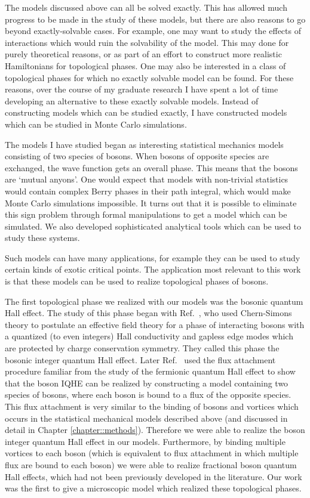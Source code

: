 The models discussed above can all be solved exactly. This has allowed much progress to be made in the study of these models, but there are also reasons to go beyond exactly-solvable cases. For example, one may want to study the effects of interactions which would ruin the solvability of the model. This may done for purely theoretical reasons, or as part of an effort to construct more realistic Hamiltonians for topological phases. One may also be interested in a class of topological phases for which no exactly solvable model can be found. For these reasons, over the course of my graduate research I have spent a lot of time developing an alternative to these exactly solvable models. Instead of constructing models which can be studied exactly, I have constructed models which can be studied in Monte Carlo simulations. 

The models I have studied began as interesting statistical mechanics models consisting of two species of bosons. When bosons of opposite species are exchanged, the wave function gets an overall phase. This means that the bosons are `mutual anyons'. One would expect that models with non-trivial statistics would contain complex Berry phases in their path integral, which would make Monte Carlo simulations impossible. It turns out that it is possible to eliminate this sign problem through formal manipulations to get a model which can be simulated. We also developed sophisticated analytical tools which can be used to study these systems.

Such models can have many applications, for example they can be used to study certain kinds of exotic critical points. The application most relevant to this work is that these models can be used to realize topological phases of bosons. 

The first topological phase we realized with our models was the bosonic quantum Hall effect. The study of this phase began with Ref.~\cite{LuVishwanath}, who used Chern-Simons theory to postulate an effective field theory for a phase of interacting bosons with a quantized (to even integers) Hall conductivity and gapless edge modes which are protected by charge conservation symmetry. They called this phase the bosonic integer quantum Hall effect. Later Ref.~\cite{SenthilLevin} used the flux attachment procedure familiar from the study of the fermionic quantum Hall effect to show that the boson IQHE can be realized by constructing a model containing two species of bosons, where each boson is bound to a flux of the opposite species. This flux attachment is very similar to the binding of bosons and vortices which occurs in the statistical mechanical models described above (and discussed in detail in Chapter \ref{chapter::methods}). Therefore we were able to realize the boson integer quantum Hall effect in our models. Furthermore, by binding multiple vortices to each boson (which is equivalent to flux attachment in which multiple flux are bound to each boson) we were able to realize fractional boson quantum Hall effects, which had not been previously developed in the literature. Our work was the first to give a microscopic model which realized these topological phases. 


